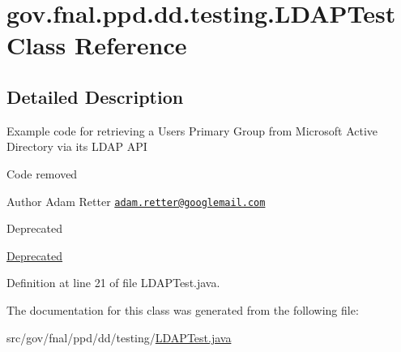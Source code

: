 \hypertarget{classgov_1_1fnal_1_1ppd_1_1dd_1_1testing_1_1LDAPTest}{\section{gov.\-fnal.\-ppd.\-dd.\-testing.\-L\-D\-A\-P\-Test Class Reference}
\label{classgov_1_1fnal_1_1ppd_1_1dd_1_1testing_1_1LDAPTest}
}


\subsection{Detailed Description}
Example code for retrieving a Users Primary Group from Microsoft Active Directory via its L\-D\-A\-P A\-P\-I

Code removed

\begin{DoxyAuthor}{Author}
Adam Retter \href{mailto:adam.retter@googlemail.com}{\tt adam.\-retter@googlemail.\-com} 
\end{DoxyAuthor}
\begin{DoxyRefDesc}{Deprecated}
\item[\hyperlink{deprecated__deprecated000008}{Deprecated}]\end{DoxyRefDesc}


Definition at line 21 of file L\-D\-A\-P\-Test.\-java.



The documentation for this class was generated from the following file\-:\begin{DoxyCompactItemize}
\item 
src/gov/fnal/ppd/dd/testing/\hyperlink{LDAPTest_8java}{L\-D\-A\-P\-Test.\-java}\end{DoxyCompactItemize}
